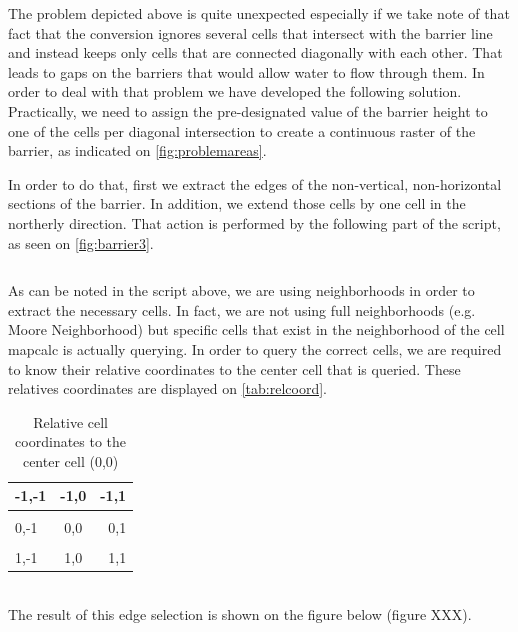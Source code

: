 The problem depicted above is quite unexpected especially if we take note of that fact that the conversion ignores several cells that intersect with the barrier line and instead keeps only cells that are connected diagonally with each other. That leads to gaps on the barriers that would allow water to flow through them. In order to deal with that problem we have developed the following solution. \\
Practically, we need to assign the pre-designated value of the barrier height to one of the cells per diagonal intersection to create a continuous raster of the barrier, as indicated on \autoref{fig:problemareas}. 

In order to do that, first we extract the edges of the non-vertical, non-horizontal sections of the barrier. In addition, we extend those cells by one cell in the northerly direction. That action is performed by the following part of the script, as seen on \autoref{fig:barrier3}.

\begin{lstlisting}

\end{lstlisting}

As can be noted in the script above, we are using neighborhoods in order to extract the necessary cells. In fact, we are not using full neighborhoods (e.g. Moore Neighborhood) but specific cells that exist in the neighborhood of the cell mapcalc is actually querying. In order to query the correct cells, we are required to know their relative coordinates to the center cell that is queried. These relatives coordinates are displayed on \autoref{tab:relcoord}.\\

\begin{table}
\centering
\begin{tabular}{l | c | r}
-1,-1 & -1,0 & -1,1 \\
\hline \\
0,-1 & 0,0 & 0,1 \\
\hline \\
1,-1 & 1,0 & 1,1 \\
\end{tabular}
\caption{Relative cell coordinates to the center cell (0,0)}
\label{tab:relcoord}
\end{table}\\

The result of this edge selection is shown on the figure below (figure XXX).\\
\\


